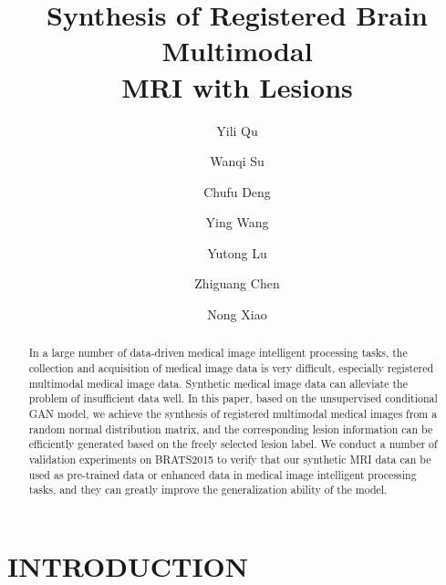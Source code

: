 \documentclass{ecai}
\begin{document}
\title{Synthesis of Registered Brain Multimodal\\
	MRI with Lesions}
\author{ Yili Qu \and Wanqi Su \and Chufu Deng \and Ying Wang \\
	\and Yutong Lu \and Zhiguang Chen \and Nong Xiao  }
\maketitle


\begin{abstract}
  In a large number of data-driven medical image intelligent processing tasks, the collection and acquisition of medical image data is very difficult, especially registered multimodal medical image data. Synthetic medical image data can alleviate the problem of insufficient data well. In this paper, based on the unsupervised conditional GAN model, we achieve the synthesis of registered multimodal medical images from a random normal distribution matrix, and the corresponding lesion information can be efficiently generated based on the freely selected lesion label. 
We conduct a number of validation experiments on BRATS2015 to verify that our synthetic MRI data can be used as pre-trained data or enhanced data in medical image intelligent processing tasks, and they can greatly improve the generalization ability of the model.
\end{abstract}

\section{INTRODUCTION}
%
\end{document}

